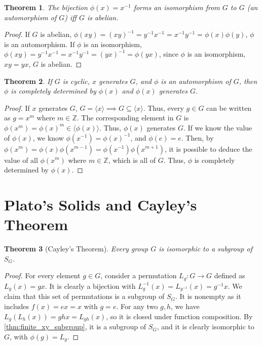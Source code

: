\documentclass{article}
\newtheorem{theorem}{Theorem}[section]
\begin{document}
\begin{theorem}
    The bijection $\phi(x) = x^{-1}$ forms an isomorphism from $G$ to $G$ (an automorphism of $G$) iff $G$ is abelian.
\end{theorem}
\begin{proof}
    If $G$ is abelian, $\phi(xy) = (xy)^{-1} = y^{-1}x^{-1} = x^{-1}y^{-1} = \phi(x)\phi(y)$, $\phi$ is an automorphism.
    If $\phi$ is an isomorphism, $\phi(xy) = y^{-1}x^{-1} = x^{-1}y^{-1} = (yx)^{-1} = \phi(yx)$,
    since $\phi$ is an isomorphism, $xy = yx$, $G$ is abelian.
\end{proof}

\begin{theorem}
    If $G$ is cyclic, $x$ generates $G$, and $\phi$ is an automorphism of $G$,
    then $\phi$ is completely determined by $\phi(x)$ and $\phi(x)$ generates $G$.
\end{theorem}
\begin{proof}
    If $x$ generates $G$, $G = \langle x\rangle \implies G \subseteq \langle x\rangle$.
    Thus, every $g \in G$ can be written as $g = x^{m}$ where $m \in \mathbb{Z}$.
    The corresponding element in $G$ is $\phi(x^{m}) = \phi(x)^{m} \in \langle\phi(x)\rangle$.
    Thus, $\phi(x)$ generates $G$.
    If we know the value of $\phi(x)$, we know $\phi(x^{-1}) = \phi(x)^{-1}$, and $\phi(e) = e$.
    Then, by $\phi(x^{m}) = \phi(x)\phi(x^{m - 1}) = \phi(x^{-1})\phi(x^{m + 1})$,
    it is possible to deduce the value of all $\phi(x^{m})$ where $m \in \mathbb{Z}$, which is all of $G$.
    Thus, $\phi$ is completely determined by $\phi(x)$.
\end{proof}

\section{Plato's Solids and Cayley's Theorem}

\begin{theorem}[Cayley's Theorem]
    \label{thm:cayley}
    Every group $G$ is isomorphic to a subgroup of $S_G$.
\end{theorem}
\begin{proof}
    For every element $g \in G$, consider a permutation $L_g : G \to G$ defined as $L_g(x) = gx$.
    It is clearly a bijection with $L_{g}^{-1}(x) = L_{g^{-1}}(x) = g^{-1}x$.
    We claim that this set of permutations is a subgroup of $S_G$.
    It is nonempty as it includes $f(x) = ex = x$ with $g = e$.
    For any two $g,h$, we have $L_g(L_h(x)) = ghx = L_{gh}(x)$, so it is closed under function composition.
    By \autoref{thm:finite_xy_subgroup}, it is a subgroup of $S_G$, and it is clearly isomorphic to $G$, with $\phi(g) = L_g$.
\end{proof}
\end{document}

